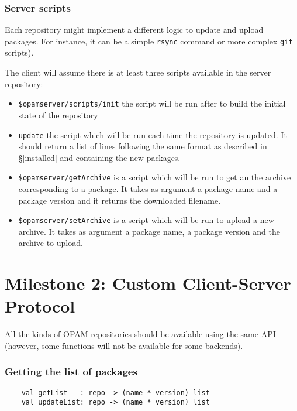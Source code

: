 \documentclass[a4paper,11pt]{article}
\begin{document}
\subsubsection{Server scripts}

Each repository might implement a different logic to update and upload
packages. For instance, it can be a simple {\tt rsync} command or
more complex {\tt git} scripts).

The client will assume there is at least three scripts available in
the server repository:

\begin{itemize}

\item \verb+$opamserver/scripts/init+ the script will be run after to
  build the initial state of the repository

\item \verb+update+ the script which will be run each
  time the repository is updated. It should return a list of lines
  following the same format as described in \S\ref{installed} and
  containing the new packages.

\item \verb+$opamserver/getArchive+ is a script which will be run to
  get an the archive corresponding to a package. It takes as argument
  a package name and a package version and it returns the downloaded
  filename.

\item \verb+$opamserver/setArchive+ is a script which will be run
  to upload a new archive. It takes as argument a package name, a
  package version and the archive to upload.

\end{itemize}

\section{Milestone 2: Custom Client-Server Protocol}
\label{api}

All the kinds of OPAM repositories should be available using the same
API (however, some functions will not be available for some backends).

\subsubsection{Getting the list of packages}

\label{getList}
\begin{verbatim}
    val getList   : repo -> (name * version) list 
    val updateList: repo -> (name * version) list
\end{verbatim}
\end{document}
